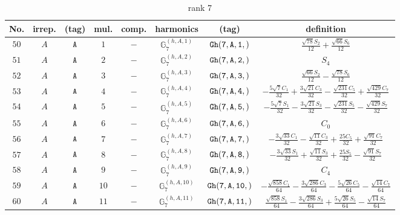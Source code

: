 \documentclass[fleqn,8pt]{jsarticle}
\begin{document}
\begin{table}[ht!]
\begin{center}
\caption{rank 7}
\renewcommand{\arraystretch}{1.3}
\begin{tabular}{cccccccc} \hline \hline
No. & irrep. & (tag) & mul. & comp. & harmonics & (tag) & definition \\ \hline
$ 50 $ & $ A $ & $ {\tt A} $ & $ 1 $ & $ - $ & $ \mathbb{G}_{7}^{(h,A,1)} $ & $ {\tt Gh(7,A,1,)} $ & $ \frac{\sqrt{78} S_{2}}{12} + \frac{\sqrt{66} S_{6}}{12} $ \\
$ 51 $ & $ A $ & $ {\tt A} $ & $ 2 $ & $ - $ & $ \mathbb{G}_{7}^{(h,A,2)} $ & $ {\tt Gh(7,A,2,)} $ & $ S_{4} $ \\
$ 52 $ & $ A $ & $ {\tt A} $ & $ 3 $ & $ - $ & $ \mathbb{G}_{7}^{(h,A,3)} $ & $ {\tt Gh(7,A,3,)} $ & $ \frac{\sqrt{66} S_{2}}{12} - \frac{\sqrt{78} S_{6}}{12} $ \\
$ 53 $ & $ A $ & $ {\tt A} $ & $ 4 $ & $ - $ & $ \mathbb{G}_{7}^{(h,A,4)} $ & $ {\tt Gh(7,A,4,)} $ & $ - \frac{5 \sqrt{7} C_{1}}{32} + \frac{3 \sqrt{21} C_{3}}{32} - \frac{\sqrt{231} C_{5}}{32} + \frac{\sqrt{429} C_{7}}{32} $ \\
$ 54 $ & $ A $ & $ {\tt A} $ & $ 5 $ & $ - $ & $ \mathbb{G}_{7}^{(h,A,5)} $ & $ {\tt Gh(7,A,5,)} $ & $ - \frac{5 \sqrt{7} S_{1}}{32} - \frac{3 \sqrt{21} S_{3}}{32} - \frac{\sqrt{231} S_{5}}{32} - \frac{\sqrt{429} S_{7}}{32} $ \\
$ 55 $ & $ A $ & $ {\tt A} $ & $ 6 $ & $ - $ & $ \mathbb{G}_{7}^{(h,A,6)} $ & $ {\tt Gh(7,A,6,)} $ & $ C_{0} $ \\
$ 56 $ & $ A $ & $ {\tt A} $ & $ 7 $ & $ - $ & $ \mathbb{G}_{7}^{(h,A,7)} $ & $ {\tt Gh(7,A,7,)} $ & $ - \frac{3 \sqrt{33} C_{1}}{32} - \frac{\sqrt{11} C_{3}}{32} + \frac{25 C_{5}}{32} + \frac{\sqrt{91} C_{7}}{32} $ \\
$ 57 $ & $ A $ & $ {\tt A} $ & $ 8 $ & $ - $ & $ \mathbb{G}_{7}^{(h,A,8)} $ & $ {\tt Gh(7,A,8,)} $ & $ - \frac{3 \sqrt{33} S_{1}}{32} + \frac{\sqrt{11} S_{3}}{32} + \frac{25 S_{5}}{32} - \frac{\sqrt{91} S_{7}}{32} $ \\
$ 58 $ & $ A $ & $ {\tt A} $ & $ 9 $ & $ - $ & $ \mathbb{G}_{7}^{(h,A,9)} $ & $ {\tt Gh(7,A,9,)} $ & $ C_{4} $ \\
$ 59 $ & $ A $ & $ {\tt A} $ & $ 10 $ & $ - $ & $ \mathbb{G}_{7}^{(h,A,10)} $ & $ {\tt Gh(7,A,10,)} $ & $ - \frac{\sqrt{858} C_{1}}{64} - \frac{3 \sqrt{286} C_{3}}{64} - \frac{5 \sqrt{26} C_{5}}{64} - \frac{\sqrt{14} C_{7}}{64} $ \\
$ 60 $ & $ A $ & $ {\tt A} $ & $ 11 $ & $ - $ & $ \mathbb{G}_{7}^{(h,A,11)} $ & $ {\tt Gh(7,A,11,)} $ & $ \frac{\sqrt{858} S_{1}}{64} - \frac{3 \sqrt{286} S_{3}}{64} + \frac{5 \sqrt{26} S_{5}}{64} - \frac{\sqrt{14} S_{7}}{64} $ \\

\end{tabular}
\end{center}
\end{table}
\end{document}
